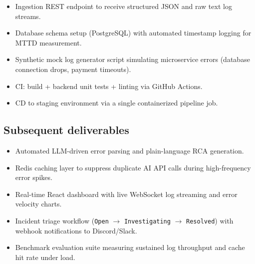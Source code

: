 \documentclass[11pt,a4paper]{article}
\begin{document}
\begin{itemize}[leftmargin=0.7cm]

\item Ingestion REST endpoint to receive structured JSON and raw text log streams.

\item Database schema setup (PostgreSQL) with automated timestamp logging for MTTD measurement.

\item Synthetic mock log generator script simulating microservice errors (database connection drops, payment timeouts).

\item CI: build + backend unit tests + linting via GitHub Actions.

\item CD to staging environment via a single containerized pipeline job.

\end{itemize}

\subsection{Subsequent deliverables}

\begin{itemize}[leftmargin=0.7cm]

\item Automated LLM-driven error parsing and plain-language RCA generation.

\item Redis caching layer to suppress duplicate AI API calls during high-frequency error spikes.

\item Real-time React dashboard with live WebSocket log streaming and error velocity charts.

\item Incident triage workflow (\texttt{Open} $\rightarrow$ \texttt{Investigating} $\rightarrow$ \texttt{Resolved}) with webhook notifications to Discord/Slack.

\item Benchmark evaluation suite measuring sustained log throughput and cache hit rate under load.

\end{itemize}

\end{document}
